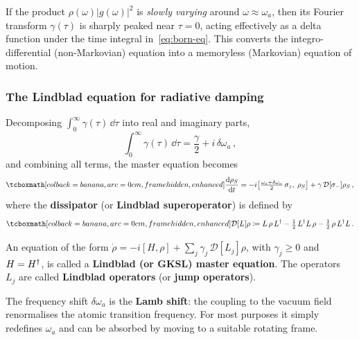 \begin{keyresult}
  If the product $\rho(\omega)\lvert g(\omega)\rvert^2$ is
  \emph{slowly varying} around $\omega \approx \omega_a$, then its
  Fourier transform $\gamma(\tau)$ is sharply peaked near $\tau = 0$,
  acting effectively as a delta function under the time integral
  in~\eqref{eq:born-eq}.  This converts the integro-differential
  (non-Markovian) equation into a memoryless (Markovian) equation of
  motion.
\end{keyresult}

\subsubsection{The Lindblad equation for radiative damping}

Decomposing $\int_0^\infty \gamma(\tau)\,\dd\tau$ into real and
imaginary parts,
\begin{equation}\label{eq:gamma-decompose}
  \int_0^\infty \gamma(\tau)\,\dd\tau
  = \frac{\gamma}{2} + i\,\delta\omega_a\,,
\end{equation}
and combining all terms, the master equation becomes
\begin{equation}\label{eq:lindblad-rad-damping}
  \eqbox{%
  \frac{\dd\rho_S}{\dd t}
  = -i\bigl[\tfrac{\omega_a + \delta\omega_a}{2}\,\sz,\;\rho_S\bigr]
    + \gamma\,\mathcal{D}[\sigma_-]\rho_S}\,,
\end{equation}
where the \textbf{dissipator} (or \textbf{Lindblad superoperator}) is
defined by
\begin{equation}\label{eq:dissipator}
  \eqbox{%
  \mathcal{D}[L]\rho
  \coloneqq L\,\rho\, L^\adj
    - \tfrac{1}{2}\,L^\adj L\,\rho
    - \tfrac{1}{2}\,\rho\, L^\adj L}\,.
\end{equation}

\begin{definition}\label{def:lindblad}
  An equation of the form
  $\dot{\rho} = -i[H,\rho] + \sum_j \gamma_j\,\mathcal{D}[L_j]\rho$,
  with $\gamma_j \geq 0$ and $H = H^\dagger$, is called a
  \textbf{Lindblad (or GKSL) master equation}.  The operators~$L_j$
  are called \textbf{Lindblad operators} (or \textbf{jump operators}).
\end{definition}

\begin{remark}
  The frequency shift $\delta\omega_a$ is the \textbf{Lamb shift}:
  the coupling to the vacuum field renormalises the atomic transition
  frequency.  For most purposes it simply redefines $\omega_a$ and
  can be absorbed by moving to a suitable rotating frame.
\end{remark}

